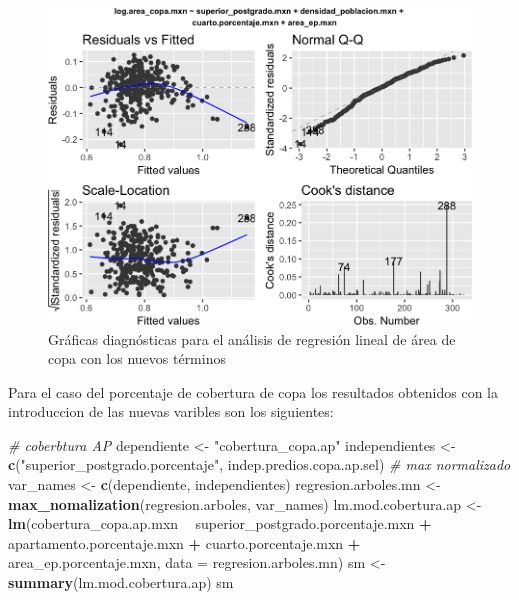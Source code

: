 \documentclass[12pt,]{book}
\newenvironment{Shaded}{\begin{snugshade}}{\end{snugshade}}
\newcommand{\KeywordTok}[1]{\textcolor[rgb]{0.13,0.29,0.53}{\textbf{#1}}}
\newcommand{\DataTypeTok}[1]{\textcolor[rgb]{0.13,0.29,0.53}{#1}}
\newcommand{\StringTok}[1]{\textcolor[rgb]{0.31,0.60,0.02}{#1}}
\newcommand{\CommentTok}[1]{\textcolor[rgb]{0.56,0.35,0.01}{\textit{#1}}}
\newcommand{\OperatorTok}[1]{\textcolor[rgb]{0.81,0.36,0.00}{\textbf{#1}}}
\newcommand{\NormalTok}[1]{#1}
\begin{document}
\begin{figure}
\includegraphics[width=1\linewidth]{tesis-unigis_files/figure-latex/diagn-mod-best-lm-copa-1} \caption{Gráficas diagnósticas para el análisis de regresión lineal de área de copa con los nuevos términos}\label{fig:diagn-mod-best-lm-copa}
\end{figure}

Para el caso del porcentaje de cobertura de copa los resultados
obtenidos con la introduccion de las nuevas varibles son los siguientes:

\begin{Shaded}
\begin{Highlighting}[]
\CommentTok{# coberbtura AP}
\NormalTok{dependiente <-}\StringTok{ "cobertura_copa.ap"}
\NormalTok{independientes <-}\StringTok{ }\KeywordTok{c}\NormalTok{(}\StringTok{"superior_postgrado.porcentaje"}\NormalTok{, indep.predios.copa.ap.sel)}
\CommentTok{# max normalizado}
\NormalTok{var_names <-}\StringTok{ }\KeywordTok{c}\NormalTok{(dependiente, independientes)}
\NormalTok{regresion.arboles.mn <-}\StringTok{ }\KeywordTok{max_nomalization}\NormalTok{(regresion.arboles, var_names)}
\NormalTok{lm.mod.cobertura.ap <-}\StringTok{ }\KeywordTok{lm}\NormalTok{(cobertura_copa.ap.mxn }\OperatorTok{~}\StringTok{ }\NormalTok{superior_postgrado.porcentaje.mxn }\OperatorTok{+}\StringTok{ }
\StringTok{    }\NormalTok{apartamento.porcentaje.mxn }\OperatorTok{+}\StringTok{ }\NormalTok{cuarto.porcentaje.mxn }\OperatorTok{+}\StringTok{ }\NormalTok{area_ep.porcentaje.mxn, }
    \DataTypeTok{data =}\NormalTok{ regresion.arboles.mn)}
\NormalTok{sm <-}\StringTok{ }\KeywordTok{summary}\NormalTok{(lm.mod.cobertura.ap)}
\NormalTok{sm}
\end{Highlighting}
\end{Shaded}
\end{document}
